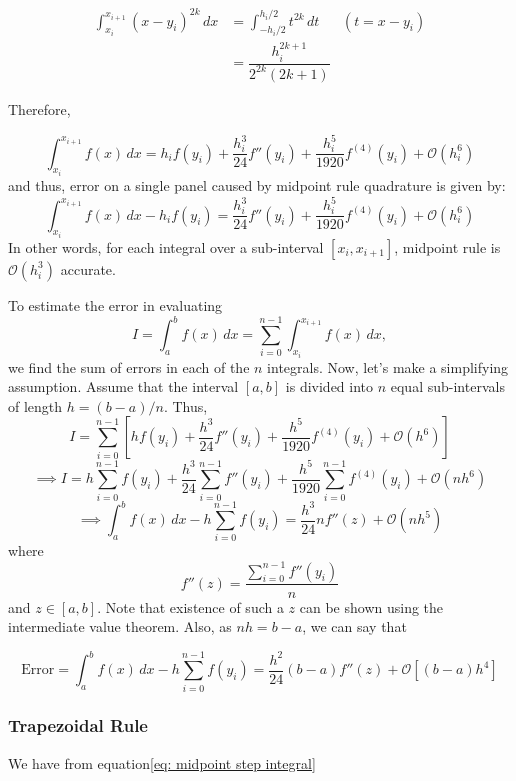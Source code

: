 \documentclass[
]{book}
\begin{document}
\begin{align*}
\int_{x_i}^{x_{i+1}} (x-y_i)^{2k}\, dx &= \int_{-h_i/2}^{h_i/2}t^{2k}\, dt & (t= x - y_i)\\
 &= \dfrac{h_i^{2k+1}}{2^{2k}(2k+1)} &
\end{align*}

Therefore,

\[\int_{x_i}^{x_{i+1}} f(x)\, dx = h_i f(y_i) + \frac{h_i^3}{24}f''(y_i)+\frac{h_i^5}{1920}f^{(4)}(y_i)+ \mathcal{O}(h_i^6)\]
and thus, error on a single panel caused by midpoint rule quadrature is given by:
\begin{equation}
\label{eq: midpoint step integral}
\int_{x_i}^{x_{i+1}} f(x)\, dx - h_i f(y_i) =  \frac{h_i^3}{24}f''(y_i)+\frac{h_i^5}{1920}f^{(4)}(y_i)+ \mathcal{O}(h_i^6)
\end{equation}
In other words, for each integral over a sub-interval \([x_i,x_{i+1}]\), midpoint rule is \(\mathcal{O}(h_i^3)\) accurate.

To estimate the error in evaluating \[I = \int_a^b f(x) \, dx = \sum_{i = 0}^{n-1} \int_{x_i}^{x_{i+1}} f(x)\, dx,\] we find the sum of errors in each of the \(n\) integrals. Now, let's make a simplifying assumption. Assume that the interval \([a,b]\) is divided into \(n\) equal sub-intervals of length \(h = (b-a)/n\). Thus,
\[I = \sum_{i=0}^{n-1} \left[ h f(y_i) + \frac{h^3}{24} f''(y_i) + \frac{h^5}{1920} f^{(4)}(y_i) + \mathcal{O}(h^6) \right]\]
\[\implies I = h\sum_{i=0}^{n-1} f(y_i)+ \frac{h^3}{24} \sum_{i=0}^{n-1}f''(y_i) + \frac{h^5}{1920}\sum_{i=0}^{n-1}f^{(4)}(y_i) + \mathcal{O}(nh^6)\]
\[\implies \int_{a}^b f(x)\, dx - h\sum_{i=0}^{n-1} f(y_i) = \frac{h^3}{24} n f''(z) + \mathcal{O}(nh^5)\]
where \[f''(z) = \frac{\sum_{i=0}^{n-1}f''(y_i)}{n}\] and \(z\in[a,b]\). Note that existence of such a \(z\) can be shown using the intermediate value theorem. Also, as \(nh = b-a\), we can say that

\begin{equation}
\text{Error} = \int_{a}^b f(x)\, dx - h\sum_{i=0}^{n-1} f(y_i) = \frac{h^2}{24} (b-a) f''(z) + \mathcal{O}[(b-a)h^4]
\end{equation}

\hypertarget{trapezoidal-rule}{%
\subsubsection{Trapezoidal Rule}\label{trapezoidal-rule}}

We have from equation\ref{eq: midpoint step integral}
\end{document}
